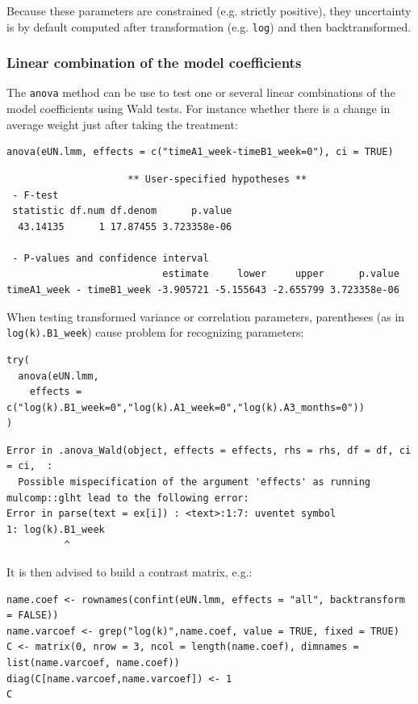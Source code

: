 \documentclass[12pt]{article}
\begin{document}
Because these parameters are constrained (e.g. strictly positive),
they uncertainty is by default computed after transformation
(e.g. \texttt{log}) and then backtransformed. 

\subsubsection{Linear combination of the model coefficients}
\label{sec:orgd7d9e3c}

The \texttt{anova} method can be use to test one or several linear
combinations of the model coefficients using Wald tests. For instance
whether there is a change in average weight just after taking the
treatment:
\lstset{language=r,label= ,caption= ,captionpos=b,numbers=none}
\begin{lstlisting}
anova(eUN.lmm, effects = c("timeA1_week-timeB1_week=0"), ci = TRUE)
\end{lstlisting}

\begin{verbatim}
                     ** User-specified hypotheses ** 
 - F-test
 statistic df.num df.denom      p.value
  43.14135      1 17.87455 3.723358e-06

 - P-values and confidence interval 
                           estimate     lower     upper      p.value
timeA1_week - timeB1_week -3.905721 -5.155643 -2.655799 3.723358e-06
\end{verbatim}


When testing transformed variance or correlation parameters,
parentheses (as in \texttt{log(k).B1\_week}) cause problem for recognizing
parameters:
\lstset{language=r,label= ,caption= ,captionpos=b,numbers=none}
\begin{lstlisting}
try(
  anova(eUN.lmm,
	effects = c("log(k).B1_week=0","log(k).A1_week=0","log(k).A3_months=0"))
)
\end{lstlisting}

\begin{verbatim}
Error in .anova_Wald(object, effects = effects, rhs = rhs, df = df, ci = ci,  : 
  Possible mispecification of the argument 'effects' as running mulcomp::glht lead to the following error: 
Error in parse(text = ex[i]) : <text>:1:7: uventet symbol
1: log(k).B1_week
          ^
\end{verbatim}


\clearpage

It is then advised to build a contrast matrix, e.g.:
\lstset{language=r,label= ,caption= ,captionpos=b,numbers=none}
\begin{lstlisting}
name.coef <- rownames(confint(eUN.lmm, effects = "all", backtransform = FALSE))
name.varcoef <- grep("log(k)",name.coef, value = TRUE, fixed = TRUE)
C <- matrix(0, nrow = 3, ncol = length(name.coef), dimnames = list(name.varcoef, name.coef))
diag(C[name.varcoef,name.varcoef]) <- 1
C
\end{lstlisting}
\end{document}
